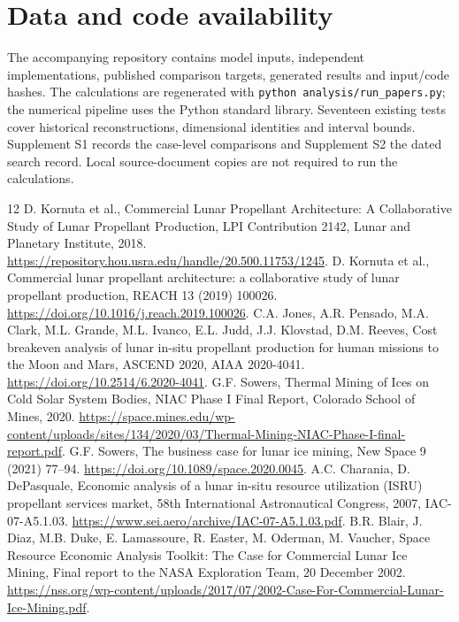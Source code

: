 \documentclass[final,5p,times,twocolumn]{elsarticle}
\begin{document}
\section*{Data and code availability}
The accompanying repository contains model inputs, independent implementations, published comparison targets, generated results and input/code hashes. The calculations are regenerated with \texttt{python analysis/run\_papers.py}; the numerical pipeline uses the Python standard library. Seventeen existing tests cover historical reconstructions, dimensional identities and interval bounds. Supplement S1 records the case-level comparisons and Supplement S2 the dated search record. Local source-document copies are not required to run the calculations.

\begin{thebibliography}{12}
 D. Kornuta et al., Commercial Lunar Propellant Architecture: A Collaborative Study of Lunar Propellant Production, LPI Contribution 2142, Lunar and Planetary Institute, 2018. \url{https://repository.hou.usra.edu/handle/20.500.11753/1245}.
 D. Kornuta et al., Commercial lunar propellant architecture: a collaborative study of lunar propellant production, REACH 13 (2019) 100026. \url{https://doi.org/10.1016/j.reach.2019.100026}.
 C.A. Jones, A.R. Pensado, M.A. Clark, M.L. Grande, M.L. Ivanco, E.L. Judd, J.J. Klovstad, D.M. Reeves, Cost breakeven analysis of lunar in-situ propellant production for human missions to the Moon and Mars, ASCEND 2020, AIAA 2020-4041. \url{https://doi.org/10.2514/6.2020-4041}.
 G.F. Sowers, Thermal Mining of Ices on Cold Solar System Bodies, NIAC Phase I Final Report, Colorado School of Mines, 2020. \url{https://space.mines.edu/wp-content/uploads/sites/134/2020/03/Thermal-Mining-NIAC-Phase-I-final-report.pdf}.
 G.F. Sowers, The business case for lunar ice mining, New Space 9 (2021) 77--94. \url{https://doi.org/10.1089/space.2020.0045}.
 A.C. Charania, D. DePasquale, Economic analysis of a lunar in-situ resource utilization (ISRU) propellant services market, 58th International Astronautical Congress, 2007, IAC-07-A5.1.03. \url{https://www.sei.aero/archive/IAC-07-A5.1.03.pdf}.
 B.R. Blair, J. Diaz, M.B. Duke, E. Lamassoure, R. Easter, M. Oderman, M. Vaucher, Space Resource Economic Analysis Toolkit: The Case for Commercial Lunar Ice Mining, Final report to the NASA Exploration Team, 20 December 2002. \url{https://nss.org/wp-content/uploads/2017/07/2002-Case-For-Commercial-Lunar-Ice-Mining.pdf}.

\end{thebibliography}
\end{document}
